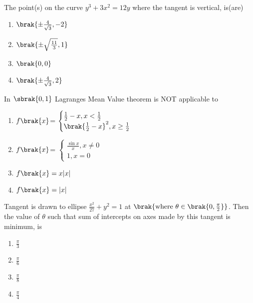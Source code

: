 \item The point(s) on the curve $y^3+3x^2=12y$ where the tangent is vertical, is(are)
\hfill {}
\begin{multicols}{2}
\begin{enumerate}
    \item $\brak{\pm \frac{4}{\sqrt{3}},-2}$
    \item $\brak{\pm\sqrt{\frac{11}{3}},1}$
    \item $\brak{0,0}$
    \item $\brak{\pm \frac{4}{\sqrt{3}},2}$
\end{enumerate}
\end{multicols}
\item In $\sbrak{0,1}$ Lagranges Mean Value theorem is NOT applicable to
\hfill {}
\begin{enumerate}
    \item $f\brak{x}$=
    $\begin{cases}
         \frac{1}{2}-x, x<\frac{1}{2}\\
        \brak{\frac{1}{2}-x}^2, x\geq \frac{1}{2}
    \end{cases}$
     \item $f\brak{x}$=
    $\begin{cases}
        \frac{\sin x}{x}, x\neq 0\\
        1, x=0
    \end{cases}$
    \item $f\brak{x}=x|x|$
    \item $f\brak{x}= |x|$
\end{enumerate}
\item Tangent is drawn to ellipse $\frac{x^2}{27}+y^2 = 1$ at $\brak{\text{where } \theta \in  \brak{0,\frac{\pi}{2}}}$. Then the value of $\theta$ such that sum of intercepts on axes made by this tangent is minimum, is
\hfill {}
\begin{multicols}{2}
\begin{enumerate}
    \item $\frac{\pi}{3}$
    \item $\frac{\pi}{6}$
    \item $\frac{\pi}{8}$
    \item $\frac{\pi}{4}$
 \end{enumerate}
\end{multicols}

